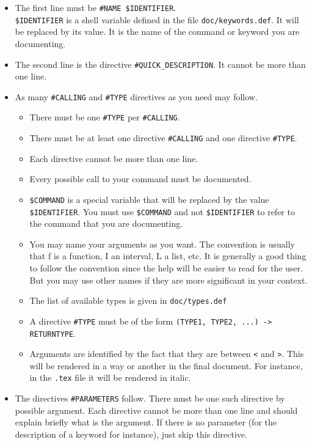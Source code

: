\documentclass{article}
\begin{document}
\begin{itemize}
\item The first line must be \texttt{\#NAME \$IDENTIFIER}.\\
\texttt{\$IDENTIFIER} is a shell variable defined in the file \texttt{doc/keywords.def}. It will be replaced by its value. It is the name of the command or keyword you are documenting.
\item The second line is the directive \texttt{\#QUICK\_DESCRIPTION}. It cannot be more than one line.
\item As many \texttt{\#CALLING} and \texttt{\#TYPE} directives as you need may follow.
  \begin{itemize}
  \item There must be one \texttt{\#TYPE} per \texttt{\#CALLING}.
  \item There must be at least one directive \texttt{\#CALLING} and one directive \texttt{\#TYPE}.
  \item Each directive cannot be more than one line.
  \item Every possible call to your command must be documented.
  \item \texttt{\$COMMAND} is a special variable that will be replaced by the value \texttt{\$IDENTIFIER}. You must use \texttt{\$COMMAND} and not \texttt{\$IDENTIFIER} to refer to the command that you are documenting.
  \item You may name your arguments as you want. The convention is usually that f is a function, I an interval, L a list, etc. It is generally a good thing to follow the convention since the help will be easier to read for the user. But you may use other names if they are more significant in your context.
  \item The list of available types is given in \texttt{doc/types.def}
  \item A directive \texttt{\#TYPE} must be of the form \texttt{(TYPE1, TYPE2, ...) -> RETURNTYPE}.
  \item Arguments are identified by the fact that they are between \texttt{<} and \texttt{>}. This will be rendered in a way or another in the final document. For instance, in the \texttt{.tex} file it will be rendered in italic.
  \end{itemize}
\item The directives \texttt{\#PARAMETERS} follow. There must be one such directive by possible argument. Each directive cannot be more than one line and should explain briefly what is the argument. If there is no parameter (for the description of a keyword for instance), just skip this directive.

\end{itemize}
\end{document}
